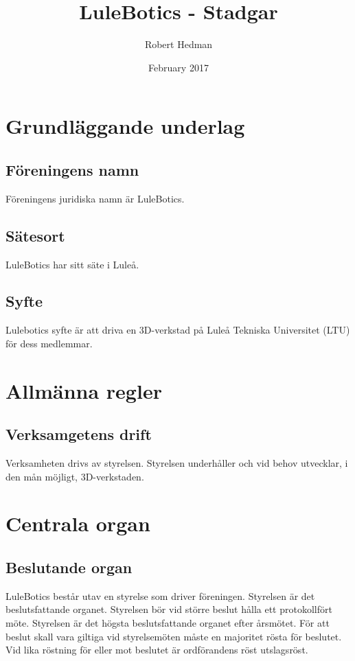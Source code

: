 \documentclass{article}
\title{LuleBotics - Stadgar}
\author{Robert Hedman}
\date{February 2017}
\begin{document}
\maketitle

\newpage

\tableofcontents

\newpage

\section{Grundläggande underlag}


\subsection{Föreningens namn}
Föreningens juridiska namn är LuleBotics.

\subsection{Sätesort}

LuleBotics har sitt säte i Luleå.

\subsection{Syfte}

Lulebotics syfte är att driva en 3D-verkstad på Luleå Tekniska Universitet (LTU) för dess medlemmar.


\section{Allmänna regler}

\subsection{Verksamgetens drift}
Verksamheten drivs av styrelsen. Styrelsen underhåller och vid behov utvecklar, i den mån möjligt, 3D-verkstaden.


\section{Centrala organ}
\subsection{Beslutande organ}
LuleBotics består utav en styrelse som driver föreningen. Styrelsen är det beslutsfattande organet. Styrelsen bör vid större beslut hålla ett protokollfört möte. Styrelsen är det högsta beslutsfattande organet efter årsmötet.  För att beslut skall vara giltiga vid styrelsemöten måste en majoritet rösta för beslutet. Vid lika röstning för eller mot beslutet är ordförandens röst utslagsröst.
\end{document}
